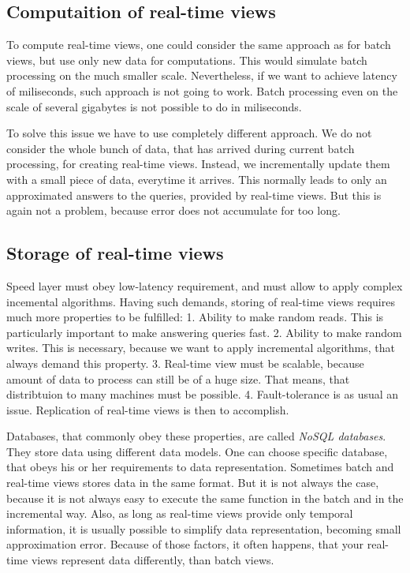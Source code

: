 \subsection{Computaition of real-time views}
To compute real-time views, one could consider the same approach as for batch views, but use only new data for computations.
This would simulate batch processing on the much smaller scale.
Nevertheless, if we want to achieve latency of miliseconds, such approach is not going to work.
Batch processing even on the scale of several gigabytes is not possible to do in miliseconds.

To solve this issue we have to use completely different approach.
We do not consider the whole bunch of data, that has arrived during current batch processing, for creating real-time views.
Instead, we incrementally update them with a small piece of data, everytime it arrives.
This normally leads to only an approximated answers to the queries, provided by real-time views.
But this is again not a problem, because error does not accumulate for too long.

\subsection{Storage of real-time views}
Speed layer must obey low-latency requirement, and must allow to apply complex
incemental algorithms.
Having such demands, storing of real-time views requires much more properties
to be fulfilled:
1. Ability to make random reads. This is particularly important to make
answering queries fast.
2. Ability to make random writes. This is necessary, because we want to apply
incremental algorithms, that always demand this property.
3. Real-time view must be scalable, because amount of data to process can still
be of a huge size. That means, that distribtuion to many machines must be
possible.
4. Fault-tolerance is as usual an issue. Replication of real-time views is then
to accomplish.

Databases, that commonly obey these properties, are called \textit{NoSQL databases}.
They store data using different data models.
One can choose specific database, that obeys his or her requirements to data
representation.
Sometimes batch and real-time views stores data in the same format.
But it is not always the case, because it is not always easy to execute the
same function in the batch and in the incremental way.
Also, as long as real-time views provide only temporal information, it is
usually possible to simplify data representation, becoming small approximation
error.
Because of those factors, it often happens, that your real-time views represent
data differently, than batch views.

